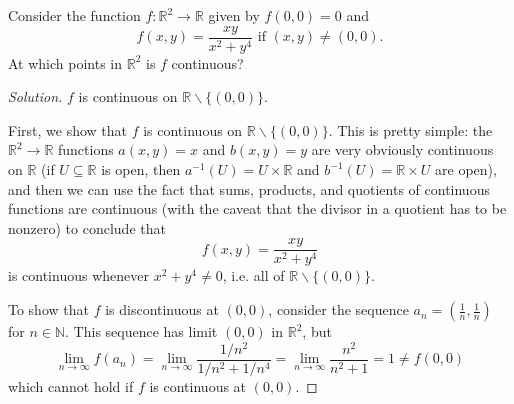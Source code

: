 \documentclass[11pt]{scrartcl}
\providecommand{\NN}{\mathbb N}
\providecommand{\RR}{\mathbb R}
\providecommand{\setdiff}{\smallsetminus}
\providecommand{\inv}{^{-1}}
\newenvironment{soln}{\begin{proof}[Solution]}{\end{proof}}
\begin{document}
\begin{problem}
	Consider the function $f\colon\RR^2\to\RR$ given by $f(0,0)=0$ and
	\[f(x,y) = \frac{xy}{x^2 + y^4}\text{ if }(x,y)\ne(0,0).\]
	At which points in $\RR^2$ is $f$ continuous?
\end{problem}

\begin{soln}
	$f$ is continuous on $\boxed{\RR\setdiff\{(0,0)\}}$.
	
	First, we show that $f$ is continuous on $\RR\setdiff\{(0,0)\}$.
	This is pretty simple: the $\RR^2\to\RR$
	functions $a(x,y) = x$ and $b(x,y) = y$
	are very obviously continuous on $\RR$ (if $U\subseteq\RR$ is open,
	then $a\inv(U) = U\times\RR$ and $b\inv(U) = \RR\times U$ are open),
	and then we can use the fact that sums, products, and quotients
	of continuous functions are continuous (with the caveat that
	the divisor in a quotient has to be nonzero) to conclude that
	\[f(x,y) = \frac{xy}{x^2 + y^4}\]
	is continuous whenever $x^2+y^4\ne 0$, i.e. all of $\RR\setdiff\{(0,0)\}$.
	
	To show that $f$ is discontinuous at $(0,0)$, consider the sequence
	$a_n = (\frac1n, \frac1n)$ for $n\in\NN$.
	This sequence has limit $(0,0)$ in $\RR^2$, but
	\[\lim_{n\to\infty} f(a_n) = \lim_{n\to\infty} \frac{1/n^2}{1/n^2 + 1/n^4}
	= \lim_{n\to\infty} \frac{n^2}{n^2 + 1} = 1\ne f(0,0)\]
	which cannot hold if $f$ is continuous at $(0,0)$.
\end{soln}
\end{document}
